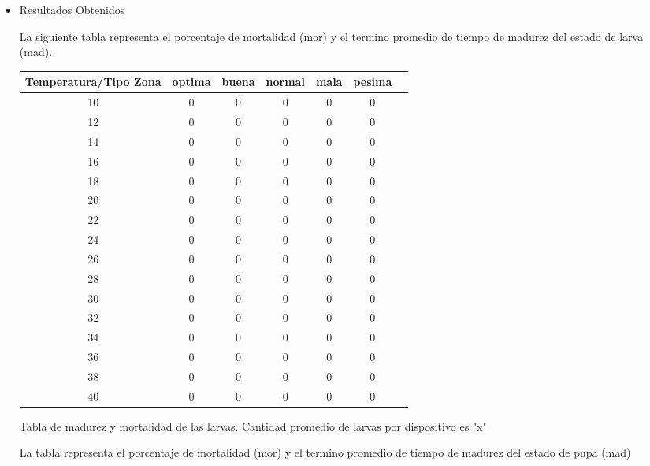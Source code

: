 \begin{itemize}
\item Resultados Obtenidos

La siguiente tabla representa el porcentaje de mortalidad (mor) y el termino
promedio de tiempo de madurez del estado de larva (mad).\\

\begin{tabular}{c*{5}{c}r}
Temperatura/Tipo Zona              &optima&buena &normal & mala & pesima  \\
\hline
10 & 0 & 0 & 0 & 0 & 0   \\
12 & 0 & 0 & 0 & 0 & 0   \\
14 & 0 & 0 & 0 & 0 & 0   \\
16 & 0 & 0 & 0 & 0 & 0   \\
18 & 0 & 0 & 0 & 0 & 0   \\
20 & 0 & 0 & 0 & 0 & 0   \\
22 & 0 & 0 & 0 & 0 & 0   \\
24 & 0 & 0 & 0 & 0 & 0   \\
26 & 0 & 0 & 0 & 0 & 0   \\
28 & 0 & 0 & 0 & 0 & 0   \\
30 & 0 & 0 & 0 & 0 & 0   \\
32 & 0 & 0 & 0 & 0 & 0   \\
34 & 0 & 0 & 0 & 0 & 0   \\
36 & 0 & 0 & 0 & 0 & 0   \\
38 & 0 & 0 & 0 & 0 & 0   \\
40 & 0 & 0 & 0 & 0 & 0   \\
\end{tabular}

Tabla de madurez y mortalidad de las larvas. Cantidad promedio de larvas
por dispositivo es "x"

La tabla representa el porcentaje de mortalidad (mor) y el termino
promedio de tiempo de madurez del estado de pupa (mad)


\end{itemize}
